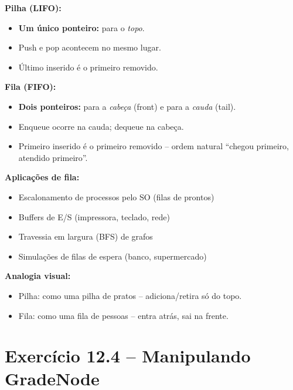 \documentclass[12pt,a4paper]{article}
\begin{document}
\begin{respostabox}
\textbf{Pilha (LIFO):}
\begin{itemize}[noitemsep]
  \item \textbf{Um único ponteiro:} para o \textit{topo}.
  \item Push e pop acontecem no mesmo lugar.
  \item Último inserido é o primeiro removido.
\end{itemize}

\textbf{Fila (FIFO):}
\begin{itemize}[noitemsep]
  \item \textbf{Dois ponteiros:} para a \textit{cabeça} (front) e para a
  \textit{cauda} (tail).
  \item Enqueue ocorre na cauda; dequeue na cabeça.
  \item Primeiro inserido é o primeiro removido -- ordem natural ``chegou primeiro,
  atendido primeiro''.
\end{itemize}

\textbf{Aplicações de fila:}
\begin{itemize}[noitemsep]
  \item Escalonamento de processos pelo SO (filas de prontos)
  \item Buffers de E/S (impressora, teclado, rede)
  \item Travessia em largura (BFS) de grafos
  \item Simulações de filas de espera (banco, supermercado)
\end{itemize}

\textbf{Analogia visual:}
\begin{itemize}[noitemsep]
  \item Pilha: como uma pilha de pratos -- adiciona/retira só do topo.
  \item Fila: como uma fila de pessoas -- entra atrás, sai na frente.
\end{itemize}
\end{respostabox}

\newpage

\section{Exercício 12.4 -- Manipulando GradeNode}
\end{document}
